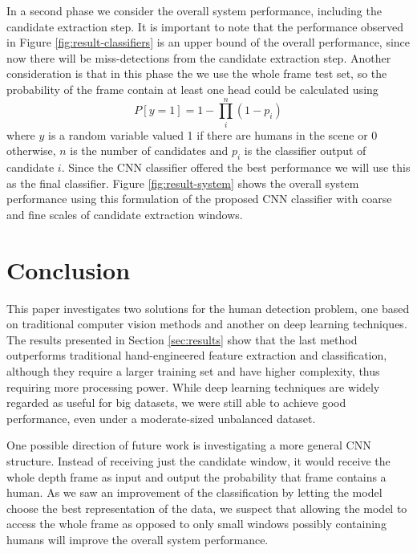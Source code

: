     In a second phase we consider the overall system performance, including the candidate extraction step. It is important to note that the performance observed in Figure \ref{fig:result-classifiers} is an upper bound of the overall performance, since now there will be miss-detections from the candidate extraction step. Another consideration is that in this phase the we use the whole frame test set, so the probability of the frame contain at least one head could be calculated using
    \begin{equation}
    P[y=1] = 1 - \prod_i^n (1-p_i)
    \end{equation}
    where $y$ is a random variable valued 1 if there are humans in the scene or 0 otherwise, $n$ is the number of candidates and $p_i$ is the classifier output of candidate $i$. Since the CNN classifier offered the best performance we will use this as the final classifier. Figure \ref{fig:result-system} shows the overall system performance using this formulation of the proposed CNN classifier with coarse and fine scales of candidate extraction windows.

    \begin{figure*}[!t]
    \vspace{-3ex}
    \centering
    \label{fig:result-system-all-zoom}
    \label{fig:result-system}
    \hfil
    \caption{Overall system performance.}
    \end{figure*}


\section{Conclusion}
\label{sec:conclusion}
    This paper investigates two solutions for the human detection problem, one based on traditional computer vision methods and another on deep learning techniques. The results presented in Section \ref{sec:results} show that the last method outperforms traditional hand-engineered feature extraction and classification, although they require a larger training set and have higher complexity, thus requiring more processing power. While deep learning techniques are widely regarded as useful for big datasets, we were still able to achieve good performance, even under a moderate-sized unbalanced dataset.

    One possible direction of future work is investigating a more general CNN structure. Instead of receiving just the candidate window, it would receive the whole depth frame as input and output the probability that frame contains a human. As we saw an improvement of the classification by letting the model choose the best representation of the data, we suspect that allowing the model to access the whole frame as opposed to only small windows possibly containing humans will improve the overall system performance.
